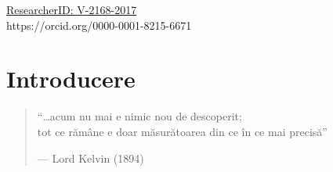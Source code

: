 \documentclass[
  11pt,
  b5paper,
  nottoc]{book}
\begin{document}
\href{http://www.researcherid.com/rid/V-2168-2017}{ResearcherID:
V-2168-2017}\\
https://orcid.org/0000-0001-8215-6671


\chapter*{Introducere}\label{introducere}


\begin{quote}
``\ldots acum nu mai e nimic nou de descoperit;\\
tot ce rămâne e doar măsurătoarea din ce în ce mai precisă''

--- Lord Kelvin (1894)
\end{quote}
\end{document}
